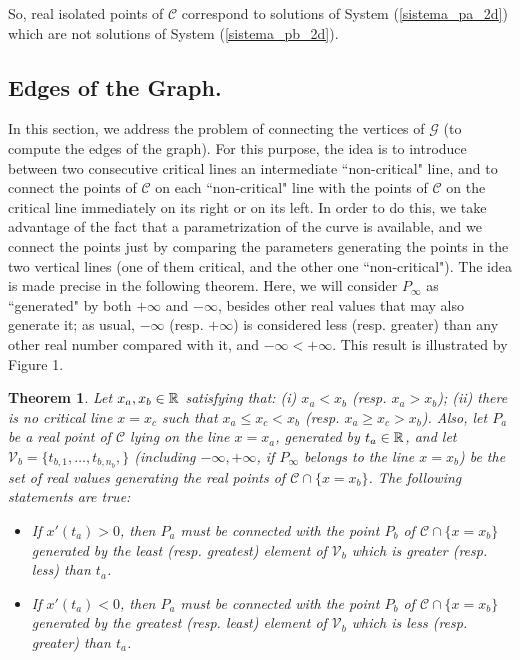 \documentclass{elsart}
\newtheorem{theorem}{{\bf Theorem}}
\begin{document}
So, real isolated points of ${\mathcal C}$ correspond to solutions of System
(\ref{sistema_pa_2d}) which are not solutions of System
(\ref{sistema_pb_2d}).








\subsection{Edges of the Graph.} \label{edges}

In this section, we address the problem of connecting the vertices
of ${\mathcal G}$ (to compute the edges of the graph). For this
purpose, the idea is to introduce between two consecutive critical
lines an intermediate ``non-critical" line, and to connect the
points of ${\mathcal C}$ on each ``non-critical" line with the
points of ${\mathcal C}$ on the critical line immediately on its
right or on its left. In order to do this, we take advantage of
the fact that a parametrization of the curve is available, and we
connect the points just by comparing the parameters generating the
points in the two vertical lines (one of them critical, and the
other one ``non-critical"). The idea is made precise in the
following theorem. Here, we will consider $P_{\infty}$ as
``generated" by both $+\infty$ and $-\infty$, besides other real
values that may also generate it; as usual, $-\infty$ (resp.
$+\infty$) is considered less (resp. greater) than any other real
number compared with it, and $-\infty<+\infty$. This result is
illustrated by Figure 1.

\begin{theorem} \label{th-connect}
Let $x_a,x_b\in {\Bbb R}$ satisfying that: (i) $x_a< x_b$ (resp.
$x_a>x_b$); (ii) there is no critical line $x=x_c$ such that
$x_a\leq x_c<x_b$ (resp. $x_a\geq x_c>x_b$). Also, let $P_a$ be a
real point of ${\mathcal C}$ lying on the line $x=x_a$, generated
by $t_a\in {\Bbb R}$, and let ${\mathcal
V}_b=\{t_{b,1},\ldots,t_{b,n_b},\}$ (including $-\infty,+\infty$,
if $P_{\infty}$ belongs to the line $x=x_b$) be the set of real
values generating the real points of ${\mathcal C}\cap \{x=x_b\}$.
The following statements are true:
\begin{itemize}
\item [(1)] If $x'(t_a)>0$, then $P_a$ must be connected with the point $P_b$ of ${\mathcal C}\cap \{x=x_b\}$ generated by
the least (resp. greatest) element of ${\mathcal V}_b$ which is
greater (resp. less) than $t_a$.
    \item [(2)] If $x'(t_a)<0$, then $P_a$ must be connected with the point $P_b$ of ${\mathcal C}\cap \{x=x_b\}$ generated by the greatest (resp. least) element of ${\mathcal V}_b$ which is less (resp. greater) than $t_a$.
\end{itemize}
\end{theorem}
\end{document}
